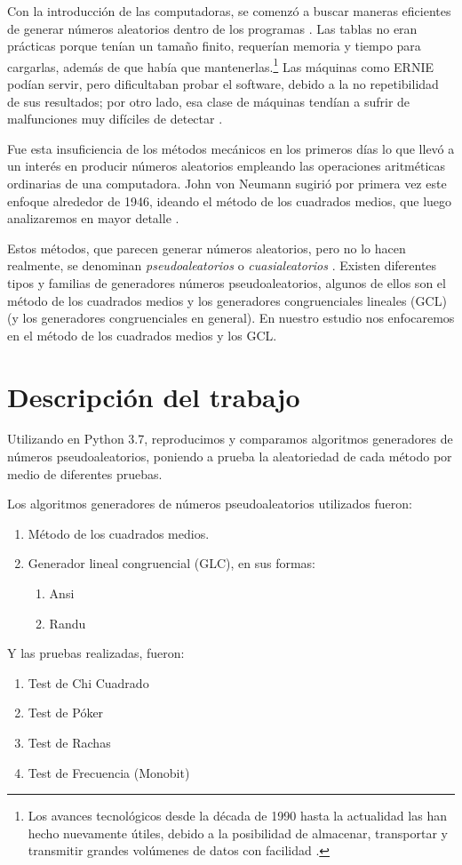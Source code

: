Con la introducción de las computadoras, se comenzó a buscar maneras eficientes de generar números aleatorios dentro de los programas \cite{knuth1997seminumerical}. Las tablas no eran prácticas porque tenían un tamaño finito, requerían memoria y tiempo para cargarlas, además de que había que mantenerlas.\footnote{Los avances tecnológicos desde la década de 1990 hasta la actualidad las han hecho nuevamente útiles, debido a la posibilidad de almacenar, transportar y transmitir grandes volúmenes de datos con facilidad \cite{knuth1997seminumerical}.} Las máquinas como ERNIE podían servir, pero dificultaban probar el software, debido a la no repetibilidad de sus resultados; por otro lado, esa clase de máquinas tendían a sufrir de malfunciones muy difíciles de detectar \cite{knuth1997seminumerical}.

Fue esta insuficiencia de los métodos mecánicos en los primeros días lo que llevó a un interés en producir números aleatorios empleando las operaciones aritméticas ordinarias de una computadora. John von Neumann sugirió por primera vez este enfoque alrededor de 1946, ideando el método de los cuadrados medios, que luego analizaremos en mayor detalle \cite{knuth1997seminumerical}.

Estos métodos, que parecen generar números aleatorios, pero no lo hacen realmente, se denominan \emph{pseudoaleatorios} o \emph{cuasialeatorios} \cite{knuth1997seminumerical}. Existen diferentes tipos y familias de generadores números pseudoaleatorios, algunos de ellos son el método de los cuadrados medios y los generadores congruenciales lineales (GCL) (y los generadores congruenciales en general). En nuestro estudio nos enfocaremos en el método de los cuadrados medios y los GCL.

\section{Descripción del trabajo}
    Utilizando en Python 3.7, reproducimos y comparamos algoritmos generadores de números pseudoaleatorios, poniendo a prueba
    la aleatoriedad de cada método por medio de diferentes pruebas.

    Los algoritmos generadores de números pseudoaleatorios utilizados fueron:
\begin{enumerate}
    \item Método de los cuadrados medios.
    \item Generador lineal congruencial (GLC), en sus formas:
    \begin{enumerate}
        \item Ansi
        \item Randu
    \end{enumerate}
\end{enumerate}
    Y las pruebas realizadas, fueron:
\begin{enumerate}
    \item Test de Chi Cuadrado
    \item Test de Póker
    \item Test de Rachas
    \item Test de Frecuencia (Monobit)
\end{enumerate}


